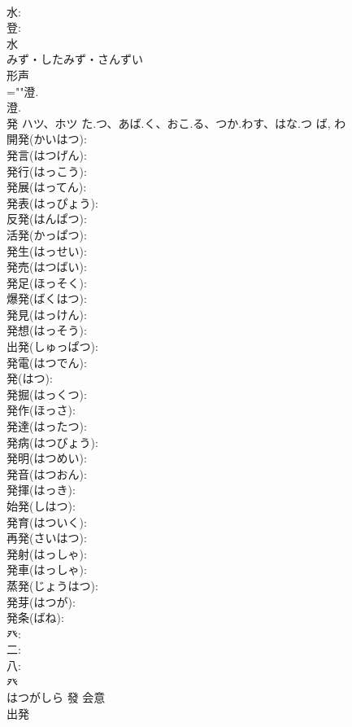 \documentclass[8pt]{extreport}
\begin{document}
\begin{CJK}{UTF8}{min}
\\	水: 
\\	登: 
\\	水	
\\	みず・したみず・さんずい	
\\	形声 
\\	=""澄.
\\	澄.
\\	発	ハツ、ホツ	た.つ、あば.く、おこ.る、つか.わす、はな.つ	ば, わ	
\\	開発(かいはつ): 
\\	発言(はつげん): 
\\	発行(はっこう): 
\\	発展(はってん): 
\\	発表(はっぴょう): 
\\	反発(はんぱつ): 
\\	活発(かっぱつ): 
\\	発生(はっせい): 
\\	発売(はつばい): 
\\	発足(ほっそく): 
\\	爆発(ばくはつ): 
\\	発見(はっけん): 
\\	発想(はっそう): 
\\	出発(しゅっぱつ): 
\\	発電(はつでん): 
\\	発(はつ): 
\\	発掘(はっくつ): 
\\	発作(ほっさ): 
\\	発達(はったつ): 
\\	発病(はつびょう): 
\\	発明(はつめい): 
\\	発音(はつおん): 
\\	発揮(はっき): 
\\	始発(しはつ): 
\\	発育(はついく): 
\\	再発(さいはつ): 
\\	発射(はっしゃ): 
\\	発車(はっしゃ): 
\\	蒸発(じょうはつ): 
\\	発芽(はつが): 
\\	発条(ばね): 
\\	癶: 
\\	二: 
\\	八: 
\\	癶	
\\	はつがしら	發	会意 
\\	出発　

\end{CJK}
\end{document}
